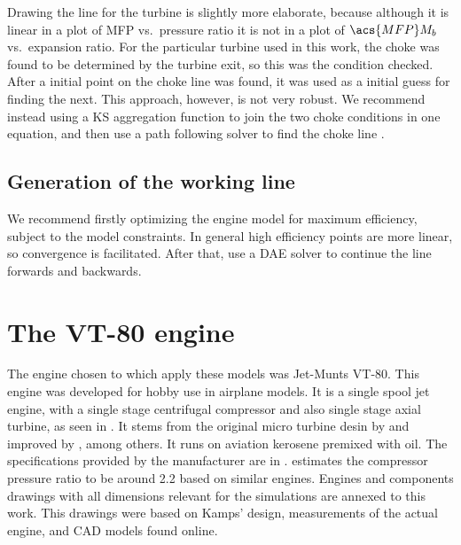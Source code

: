 Drawing the line for the turbine is slightly more elaborate, because although it is linear in a plot of \acs{MFP} vs.\ pressure ratio it is not in a plot of $\acs{MFP}M_b$ vs.\ expansion ratio.
For the particular turbine used in this work, the choke was found to be determined by the turbine exit, so this was the condition checked. After a initial point on the choke line was found, it was used as a initial guess for finding the next. This approach, however, is not very robust. We recommend instead using a KS aggregation function to join the two choke conditions in one equation, and then use a path following solver to find the choke line \cite{martins}.

\subsection{Generation of the working line}
We recommend firstly optimizing the engine model for maximum efficiency, subject to the model constraints. In general high efficiency points are more linear, so convergence is facilitated.
After that, use a \ac{DAE} solver to continue the line forwards and backwards.

\section{The VT-80 engine}
The engine chosen to which apply these models was Jet-Munts VT-80.
This engine was developed for hobby use in airplane models.
It is a single spool jet engine, with a single stage centrifugal compressor 
 and also single stage axial turbine, as seen in . It stems from the original micro turbine desin by \textcite{Schreckling1994} and improved by \textcite{Kamps1999}, among others. 
It runs on aviation kerosene premixed with oil.
The specifications provided by the manufacturer are in .
\textcite{bolsoni} estimates the compressor pressure ratio 
to be around 2.2 based on similar engines. Engines and components drawings with all dimensions relevant for the simulations are annexed to this work. This drawings were based on Kamps' design, measurements of the actual engine, and CAD models found online.

